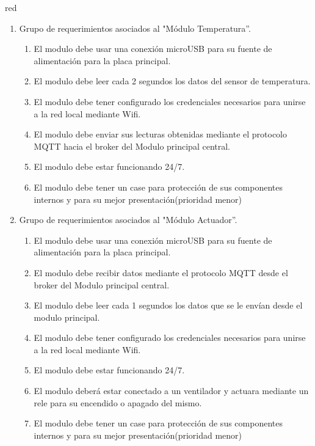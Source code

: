 \documentclass[11pt]{charter}
\begin{document}
\begin{consigna}{red}
\begin{enumerate}
\begin{enumerate}
	\end{enumerate}	
\item Grupo de requerimientos asociados al "Módulo Temperatura''.
	\begin{enumerate}
	\item El modulo debe usar una conexión microUSB para su fuente de alimentación para la placa principal.
	\item El modulo debe leer cada 2 segundos los datos del sensor de temperatura.
	\item El modulo debe tener configurado los credenciales necesarios para unirse a la red local mediante Wifi.
	\item El modulo debe enviar sus lecturas obtenidas mediante el protocolo MQTT hacia el broker del Modulo principal central.
	\item El modulo debe estar funcionando 24/7.
	\item El modulo debe tener un case para protección de sus componentes internos y para su mejor presentación(prioridad menor)
	\end{enumerate}	
\item Grupo de requerimientos asociados al "Módulo Actuador''.
	\begin{enumerate}
	\item El modulo debe usar una conexión microUSB para su fuente de alimentación para la placa principal.
		\item El modulo debe recibir datos mediante el protocolo MQTT desde el broker del Modulo principal central.
	\item El modulo debe leer cada 1 segundos los datos que se le envían desde el modulo principal.
	\item El modulo debe tener configurado los credenciales necesarios para unirse a la red local mediante Wifi.
	\item El modulo debe estar funcionando 24/7.
	\item El modulo deberá estar conectado a un ventilador y actuara mediante un rele para su encendido o apagado del mismo.
	\item El modulo debe tener un case para protección de sus componentes internos y para su mejor presentación(prioridad menor)
	\end{enumerate}


\end{enumerate}
\end{consigna}
\end{document}

